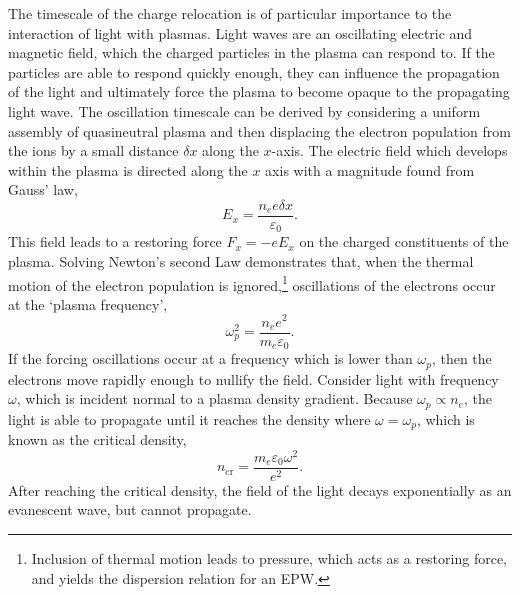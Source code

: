 The timescale of the charge relocation is of particular importance to the interaction of light with plasmas.
Light waves are an oscillating electric and magnetic field, which the charged particles in the plasma can respond to.
If the particles are able to respond quickly enough, they can influence the propagation of the light and ultimately force the plasma to become opaque to the propagating light wave.
The oscillation timescale can be derived by considering a uniform assembly of quasineutral plasma and then displacing the electron population from the ions by a small distance $\delta x$ along the $x$-axis.
The electric field which develops within the plasma is directed along the $x$ axis with a magnitude found from Gauss' law,
\begin{equation}
    E_x = \frac{n_e e \delta x}{\varepsilon_0}.
\end{equation}
This field leads to a restoring force $F_x = -eE_x$ on the charged constituents of the plasma.
Solving Newton's second Law demonstrates that, when the thermal motion of the electron population is ignored,\footnote{Inclusion of thermal motion leads to pressure, which acts as a restoring force, and yields the dispersion relation for an \ac{EPW}.} oscillations of the electrons occur at the `plasma frequency',
\begin{equation}
    \label{eq:theory_plasma_freq}
    \omega_{p}^2 = \frac{n_e e^2}{m_e \varepsilon_0}.
\end{equation}
If the forcing oscillations occur at a frequency which is lower than $\omega_p$, then the electrons move rapidly enough to nullify the field.
Consider light with frequency $\omega$, which is incident normal to a plasma density gradient.
Because $\omega_p\propto n_e$, the light is able to propagate until it reaches the density where $\omega = \omega_p$, which is known as the critical density,
\begin{equation}
    \label{eq:theory_critical_density}
    n_{\text{cr}} = \frac{m_e \varepsilon_0 \omega^2}{e^2}.
\end{equation}
After reaching the critical density, the field of the light decays exponentially as an evanescent wave, but cannot propagate.

